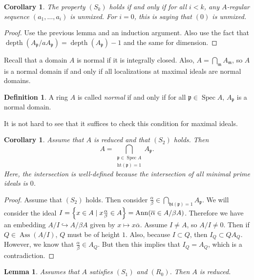 \documentclass[leqno, openany]{memoir}
\newtheorem{cor}[thm]{Corollary}
\newtheorem{lem}[thm]{Lemma}
\theoremstyle{definition}
\newtheorem{defn}[thm]{Definition}
\theoremstyle{remark}
\theoremstyle{plain}
\theoremstyle{definition}
\theoremstyle{remark}
\newcommand{\mf}[1]{\mathfrak{#1}}
\newcommand{\mr}[1]{\mathrm{#1}}
\newcommand{\ol}[1]{\overline{#1}}
\DeclareMathOperator{\Spec}{Spec}
\DeclareMathOperator{\Ann}{Ann}
\DeclareMathOperator{\Ass}{Ass}
\DeclareMathOperator{\dpth}{depth}
\begin{document}
\begin{cor} The property $(S_k)$ holds if and only if for all $i < k$, any
$A$-regular sequence $(a_1, \ldots, a_i)$ is unmixed. For $i = 0$, this is
saying that $(0)$ is unmixed.  \end{cor}

\begin{proof} Use the previous lemma and an induction argument. Also use the
fact that $\dpth(A_{\mf{p}} / a A_{\mf{p}}) = \dpth(A_{\mf{p}}) - 1$ and the
same for dimension.  \end{proof}

Recall that a domain $A$ is normal if it is integrally closed. Also, $A =
\bigcap_{\mf{m}} A_{\mf{m}}$, so $A$ is a normal domain if and only if all
localizations at maximal ideals are normal domains.

\begin{defn} A ring $A$ is called \textit{normal} if and only if for all
$\mf{p} \in \Spec A$, $A_{\mf{p}}$ is a normal domain.  \end{defn}

It is not hard to see that it suffices to check this condition for maximal
ideals. 

\begin{cor} Assume that $A$ is reduced and that $(S_2)$ holds. Then \[ A =
\bigcap_{\substack{\mf{p} \in \Spec A \\ \mr{ht}(\mf{p}) = 1}} A_{\mf{p}}. \]
Here, the intersection is well-defined because the intersection of all minimal
prime ideals is $\qty{0}$.  \end{cor}

\begin{proof} Assume that $(S_2)$ holds. Then consider $\frac{\alpha}{\beta}
    \in \bigcap_{\mf{ht}(\mf{p}) = 1} A_{\mf{p}}$. We will consider the ideal
    $I = \qty{x \in A \mid x \frac{\alpha}{\beta} \in A} = \Ann (\ol{\alpha}
    \in A/\beta A)$. Therefore we have an embedding $A/I \hookrightarrow
    A/\beta A$ given by $x \mapsto x \ol{\alpha}$. Assume $I \neq A$, so $A/I
    \neq 0$. Then if $Q \in \Ass(A/I)$, $Q$ must be of height $1$. Also,
    because $I \subset Q$, then $I_Q \subset Q A_Q$. However, we know that
    $\frac{\alpha}{\beta} \in A_Q$. But then this implies that $I_Q = A_Q$,
    which is a contradiction.  \end{proof}

\begin{lem} Assumes that $A$ satisfies $(S_1)$ and $(R_0)$. Then $A$ is
reduced.  \end{lem}
\end{document}
